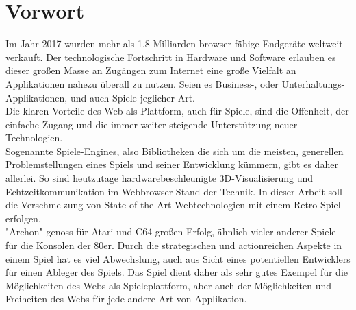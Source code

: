 \chapter*{Vorwort}
\label{cha:Vorwort}

Im Jahr 2017 wurden mehr als 1,8 Milliarden browser-fähige Endgeräte weltweit verkauft. Der technologische Fortschritt in Hardware und Software erlauben es dieser großen Masse an Zugängen zum Internet eine große Vielfalt an Applikationen nahezu überall zu nutzen. Seien es Business-, oder Unterhaltungs-Applikationen, und auch Spiele jeglicher Art.\\
Die klaren Vorteile des Web als Plattform, auch für Spiele, sind die Offenheit, der einfache Zugang und die immer weiter steigende Unterstützung neuer Technologien.\\
Sogenannte Spiele-Engines, also Bibliotheken die sich um die meisten, generellen Problemstellungen eines Spiels und seiner Entwicklung kümmern, gibt es daher allerlei.
So sind heutzutage hardwarebeschleunigte 3D-Visualisierung und Echtzeitkommunikation im Webbrowser Stand der Technik.
In dieser Arbeit soll die Verschmelzung von State of the Art Webtechnologien mit einem Retro-Spiel erfolgen.\\
"Archon" genoss für Atari und C64 großen Erfolg, ähnlich vieler anderer Spiele für die Konsolen der 80er.
Durch die strategischen und actionreichen Aspekte in einem Spiel hat es viel Abwechslung, auch aus Sicht eines potentiellen Entwicklers für einen Ableger des Spiels. Das Spiel dient daher als sehr gutes Exempel für die Möglichkeiten des Webs als Spieleplattform, aber auch der Möglichkeiten und Freiheiten des Webs für jede andere Art von Applikation.